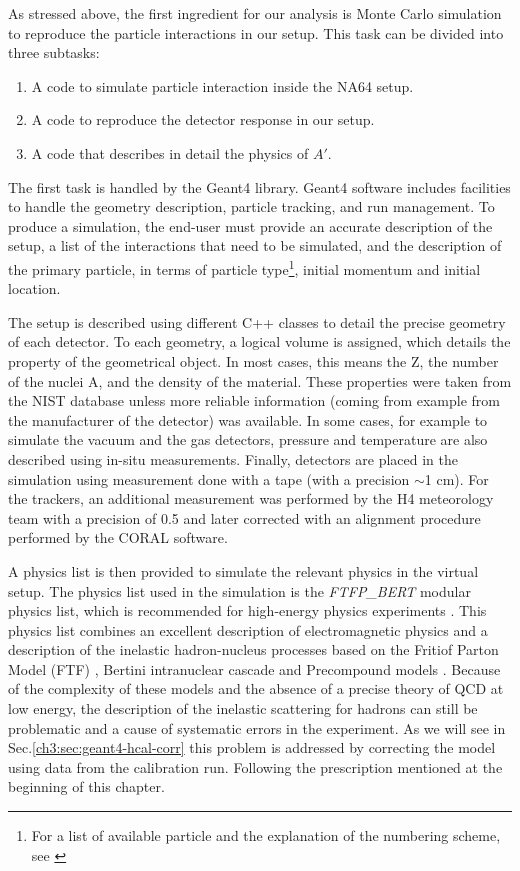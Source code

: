 As stressed above, the first ingredient for our analysis is Monte Carlo simulation to reproduce the particle interactions in our setup. This task can be divided into three subtasks:

\begin{enumerate}
\item A code to simulate particle interaction inside the NA64 setup.
\item A code to reproduce the detector response in our setup.  
\item A code that describes in detail the physics of $A'$.
\end{enumerate}

The first task is handled by the Geant4 library\cite{AGOSTINELLI2003250}. Geant4 software includes facilities to handle the geometry description, particle tracking, and run management. To produce a simulation, the end-user must provide an accurate description of the setup, a list of the interactions that need to be simulated, and the description of the primary particle, in terms of particle type\footnote{For a list of available particle and the explanation of the numbering scheme, see \cite{geant4-pdg}}, initial momentum and initial location.

The setup is described using different C++ classes to detail the precise geometry of each detector. To each geometry, a logical volume is assigned, which details the property of the geometrical object. In most cases, this means the Z, the number of the nuclei A, and the density of the material. These properties were taken from the NIST database \cite{nist-database} unless more reliable information (coming from example from the manufacturer of the detector) was available. In some cases, for example to simulate the vacuum and the gas detectors, pressure and temperature are also described using in-situ measurements. Finally, detectors are placed in the simulation using measurement done with a tape (with a precision $\sim$1 \si{\centi\meter}). For the trackers, an additional measurement was performed by the H4 meteorology team with a precision of 0.5 \mmi\cite{meterology-measurements} and later corrected with an alignment procedure performed by the CORAL software\cite{ABBON2007455}. 

A physics list is then provided to simulate the relevant physics in the virtual setup. The physics list used in the simulation is the \textit{\textrm{FTFP\_BERT}} modular physics list, which is recommended for high-energy physics experiments \cite{ALLISON2016186}. This physics list combines an excellent description of electromagnetic physics and a description of the inelastic hadron-nucleus processes based on the Fritiof Parton Model (FTF) \cite{Uzhinsky:2013hea}, Bertini intranuclear cascade \cite{Heikkinen:2003sc} and Precompound models \cite{Apostolakis:2009zz}. Because of the complexity of these models and the absence of a precise theory of QCD at low energy, the description of the inelastic scattering for hadrons can still be problematic and a cause of systematic errors in the experiment. As we will see in Sec.\ref{ch3:sec:geant4-hcal-corr} this problem is addressed by correcting the model using data from the calibration run. Following the prescription mentioned at the beginning of this chapter.

